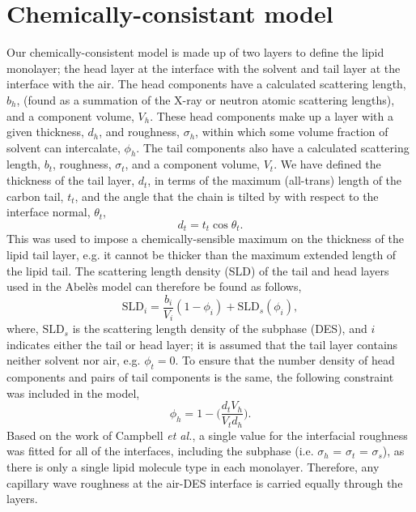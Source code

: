 \documentclass[11pt,a4paper]{article}
\begin{document}
\section{Chemically-consistant model}
Our chemically-consistent model is made up of two layers to define the lipid monolayer; the head layer at the interface with the solvent and tail layer at the interface with the air. The head components have a calculated scattering length, $b_h$, (found as a summation of the X-ray or neutron atomic scattering lengths), and a component volume, $V_h$. These head components make up a layer with a given thickness, $d_h$, and roughness, $\sigma_h$, within which some volume fraction of solvent can intercalate, $\phi_h$. The tail components also have a calculated scattering length, $b_t$, roughness, $\sigma_t$, and a component volume, $V_t$. We have defined the thickness of the tail layer, $d_t$, in terms of the maximum (all-trans) length of the carbon tail, $t_t$, and the angle that the chain is tilted by with respect to the interface normal, $\theta_t$,
%
\begin{equation}
\label{equ:tl}
d_t = t_t \cos{\theta_t}.
\end{equation}
%
This was used to impose a chemically-sensible maximum on the thickness of the lipid tail layer, e.g. it cannot be thicker than the maximum extended length of the lipid tail. The scattering length density (SLD) of the tail and head layers used in the Abel\`{e}s model can therefore be found as follows,
%
\begin{equation}
\text{SLD}_i = \frac{b_i}{V_i}(1 - \phi_i) + \text{SLD}_{s}(\phi_i),
\end{equation}
%
where, $\text{SLD}_{s}$ is the scattering length density of the subphase (DES), and $i$ indicates either the tail or head layer; it is assumed that the tail layer contains neither solvent nor air, e.g. $\phi_t = 0$. To ensure that the number density of head components and pairs of tail components is the same, the following constraint was included in the model,\cite{Braun2017}
%
\begin{equation}
\label{equ:phih}
\phi_h =  1 - \bigg(\frac{d_tV_h}{V_td_h}\bigg).
\end{equation}
%
Based on the work of Campbell \emph{et al.},\cite{Campbell2018} a single value for the interfacial roughness was fitted for all of the interfaces, including the subphase (i.e. $\sigma_h$ = $\sigma_t$ = $\sigma_s$), as there is only a single lipid molecule type in each monolayer. Therefore, any capillary wave roughness at the air-DES interface is carried equally through the layers.
\end{document}
